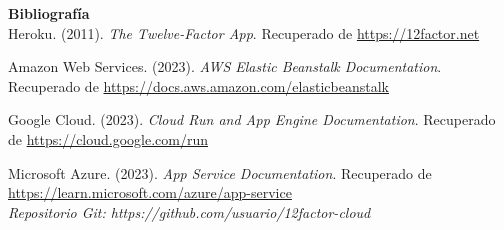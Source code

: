 \documentclass[12pt,letterpaper]{article}
\begin{document}
\textbf{Bibliografía}  \\
Heroku. (2011). \textit{The Twelve-Factor App}. Recuperado de \url{https://12factor.net}  

Amazon Web Services. (2023). \textit{AWS Elastic Beanstalk Documentation}. Recuperado de \url{https://docs.aws.amazon.com/elasticbeanstalk}  

Google Cloud. (2023). \textit{Cloud Run and App Engine Documentation}. Recuperado de \url{https://cloud.google.com/run}  

Microsoft Azure. (2023). \textit{App Service Documentation}. Recuperado de \url{https://learn.microsoft.com/azure/app-service}  \\


\textit{Repositorio Git: https://github.com/usuario/12factor-cloud}
\end{document}
